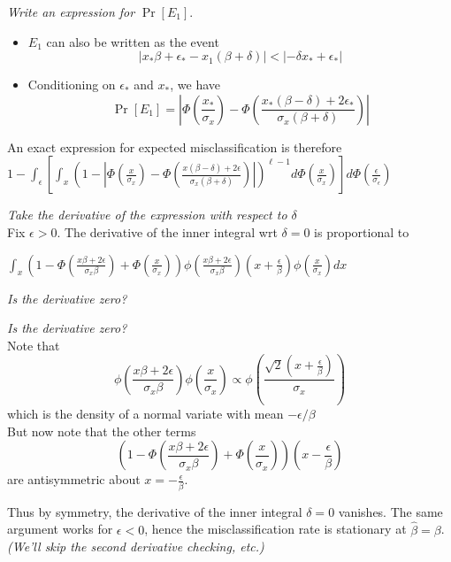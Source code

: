 \documentclass{beamer}
\begin{document}
\begin{frame}
\emph{Write an expression for }$\Pr[E_1]$.
\begin{itemize}
\item
$E_1$ can also be written as the event
\[
|x_* \beta + \epsilon_* - x_1 (\beta + \delta)| < |- \delta x_* + \epsilon_*|
\]
\item
Conditioning on $\epsilon_*$ and $x_*$, we have
\[
\Pr[E_1] = \left|
\Phi\left(\frac{x_*}{\sigma_x}\right)
 - 
\Phi\left(\frac{x_*(\beta - \delta) + 2\epsilon_*}{\sigma_x (\beta + \delta)}\right)
\right|
\]
\end{itemize}
\end{frame}

\begin{frame}
An exact expression for expected misclassification is therefore\\
$
1 - \int_\epsilon \left[\int_x  
\left(1 - 
\left|
\Phi\left(\frac{x}{\sigma_x}\right)
 - 
\Phi\left(\frac{x(\beta - \delta) + 2\epsilon}{\sigma_x (\beta + \delta)}\right)
\right|\right)^{\ell - 1}
 d\Phi(\frac{x}{\sigma_x}) \right]  d\Phi(\frac{\epsilon}{\sigma_\epsilon})
$
\end{frame}

\begin{frame}
\emph{Take the derivative of the expression with respect to $\delta$}\\
Fix $\epsilon > 0$.
The derivative of the inner integral wrt $\delta = 0$ is proportional to
\begin{center}
$\int_x (1 - \Phi(\frac{x\beta + 2\epsilon}{\sigma_x \beta}) + \Phi(\frac{x}{\sigma_x})) \phi(\frac{x\beta + 2\epsilon}{\sigma_x \beta})(x + \frac{\epsilon}{\beta}) \phi(\frac{x}{\sigma_x}) dx
$\end{center}
\emph{Is the derivative zero?}
\end{frame}
\begin{frame}
\emph{Is the derivative zero?}\\
Note that
\[
\phi\left(\frac{x\beta + 2\epsilon}{\sigma_x \beta}\right)
\phi\left(\frac{x}{\sigma_x}\right) \propto 
\phi\left(\frac{\sqrt{2} (x + \frac{\epsilon}{\beta})}{\sigma_x}\right)
\]
which is the density of a normal variate with mean $-\epsilon/\beta$\\

But now note that the other terms
\[
\left(1 - \Phi\left(\frac{x\beta + 2\epsilon}{\sigma_x \beta}\right)
 + \Phi\left(\frac{x}{\sigma_x}\right)\right)
\left(x - \frac{\epsilon}{\beta}\right)
\]
are antisymmetric about $x = -\frac{\epsilon}{\beta}$.

Thus by symmetry, the derivative of the inner integral $\delta = 0$ vanishes.
The same argument works for $\epsilon < 0$, hence the misclassification rate is stationary at $\hat{\beta} = \beta$.\\

\emph{(We'll skip the second derivative checking, etc.)}
\end{frame}
\end{document}
